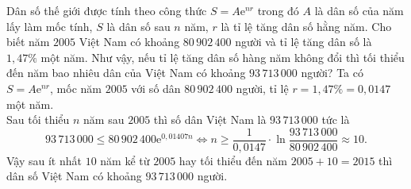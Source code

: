\begin{bt}%
Dân số thế giới được tính theo công thức $S=A\mathrm{e}^{nr}$ trong đó $A$ là dân số của năm lấy làm mốc tính, $S$ là dân số sau $n$ năm, $r$ là tỉ lệ tăng dân số hằng năm. Cho biết năm $2005$ Việt Nam có khoảng $80\,902\,400$ người và tỉ lệ tăng dân số là $1{,}47\%$ một năm. Như vậy, nếu tỉ lệ tăng dân số hàng năm không đổi thì tối thiểu đến năm bao nhiêu dân của Việt Nam có khoảng $93\,713\,000$ người?
\loigiai
{
Ta có $S=A\mathrm{e}^{nr}$, mốc năm $2005$ với số dân $80\,902\,400$ người, tỉ lệ $r=1{,}47\%=0{,}0147$ một năm.\\
Sau tối thiểu $n$ năm sau $2005$ thì số dân Việt Nam là $93\,713\,000$ tức là
$$93\,713\,000\leqslant 80\,902\,400\mathrm{e}^{0{,}01407n} \Leftrightarrow n\geqslant \dfrac{1}{0{,}0147}\cdot\ln \dfrac{93\,713\,000}{80\,902\,400}\approx 10.$$
Vậy sau ít nhất $10$ năm kể từ $2005$ hay tối thiểu đến năm $2005+10=2015$ thì dân số Việt Nam có khoảng $93\,713\,000$ người.
}
\end{bt}
